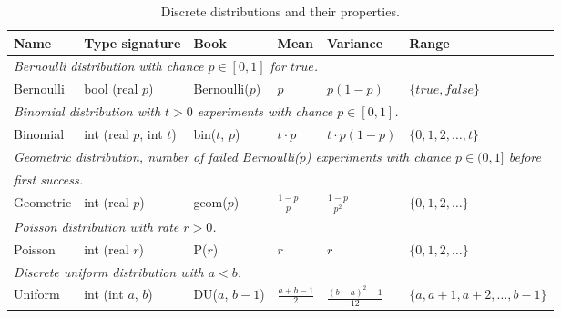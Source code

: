 \begin{table}[t]
  \begin{center}
  \begin{tabular}{|l l l l l l|} \hline
    \textbf{Name} & \textbf{Type signature} & \textbf{Book} & \textbf{Mean} &
        \textbf{Variance} & \textbf{Range} \\

    \hline
    \multicolumn{6}{|l|}{\emph{Bernoulli distribution with chance
                               $p \in [0, 1]$ for $true$.}} \\
    Bernoulli &
    bool (real $p$) &
    Bernoulli($p$) &
    $p$ &
    $p(1-p)$ &
    $\{true,false\}$ \\[2pt]

    \hline
    \multicolumn{6}{|l|}{\emph{Binomial distribution with $t>0$ experiments
                               with chance $p \in [0, 1]$.}} \\
    Binomial &
    int (real $p$, int $t$) &
    bin($t$, $p$) &
    $t\cdot{}p$ &
    $t\cdot{}p(1-p)$ &
    $\{0,1,2,\ldots,t\}$ \\[2pt]

    \hline
    \multicolumn{6}{|l|}{\emph{Geometric distribution, number of failed
                               Bernoulli($p$) experiments with chance
                               $p \in (0, 1]$ before}} \\
    \multicolumn{6}{|l|}{\emph{first success.}} \\
    Geometric &
    int (real $p$) &
    geom($p$) &
    $\frac{1-p}{p}$ &
    $\frac{1-p}{p^2}$ &
    $\{0,1,2,\ldots\}$ \\[2pt]

    \hline
    \multicolumn{6}{|l|}{\emph{Poisson distribution with rate $r>0$.}} \\
    Poisson &
    int (real $r$) &
    P($r$) &
    $r$ &
    $r$ &
    $\{0,1,2,\ldots\}$ \\[2pt]

    \hline
    \multicolumn{6}{|l|}{\emph{Discrete uniform distribution with $a<b$.}} \\
    Uniform &
    int (int $a$, $b$) &
    DU($a$, $b-1$) &
    $\frac{a+b-1}{2}$ &
    $\frac{(b-a)^2-1}{12}$ &
    $\{a,a+1,a+2,\ldots,b-1\}$ \\[2pt]

    \hline
  \end{tabular}
  \end{center}
  \caption{Discrete distributions and their properties.}
  \label{table:distr-discrete}
\end{table}


